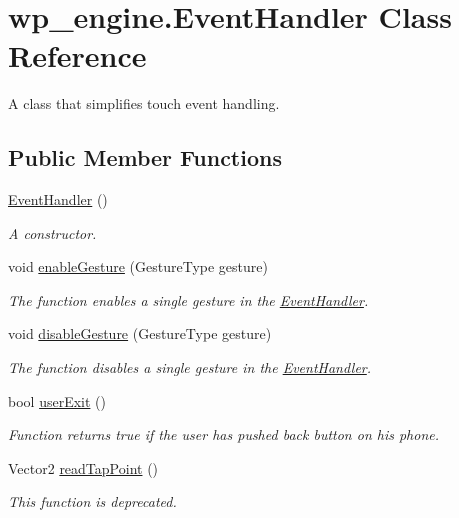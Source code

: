 \hypertarget{classwp__engine_1_1_event_handler}{\section{wp\-\_\-engine.\-Event\-Handler Class Reference}
\label{classwp__engine_1_1_event_handler}
}


A class that simplifies touch event handling.  


\subsection*{Public Member Functions}
\begin{DoxyCompactItemize}
\item 
\hyperlink{classwp__engine_1_1_event_handler_a0cae2a069dd9c683df9f4070af440361}{Event\-Handler} ()
\begin{DoxyCompactList}\small\item\em A constructor. \end{DoxyCompactList}\item 
void \hyperlink{classwp__engine_1_1_event_handler_a5ce6db808f28e636db99c951f1efee4a}{enable\-Gesture} (Gesture\-Type gesture)
\begin{DoxyCompactList}\small\item\em The function enables a single gesture in the \hyperlink{classwp__engine_1_1_event_handler}{Event\-Handler}. \end{DoxyCompactList}\item 
void \hyperlink{classwp__engine_1_1_event_handler_a2567fdd7bf296859cc15a99bca4ca93c}{disable\-Gesture} (Gesture\-Type gesture)
\begin{DoxyCompactList}\small\item\em The function disables a single gesture in the \hyperlink{classwp__engine_1_1_event_handler}{Event\-Handler}. \end{DoxyCompactList}\item 
bool \hyperlink{classwp__engine_1_1_event_handler_a650ea5cc46aaa36b2879ffda3756ec45}{user\-Exit} ()
\begin{DoxyCompactList}\small\item\em Function returns true if the user has pushed back button on his phone. \end{DoxyCompactList}\item 
Vector2 \hyperlink{classwp__engine_1_1_event_handler_ad8ab3506a5103cc00710fd604f988a51}{read\-Tap\-Point} ()
\begin{DoxyCompactList}\small\item\em This function is deprecated. \end{DoxyCompactList}\item 

\end{DoxyCompactItemize}
